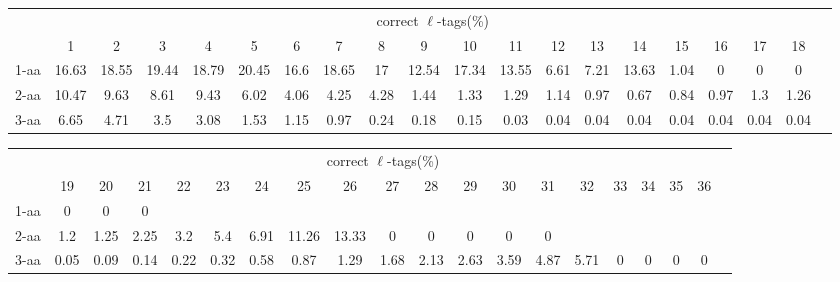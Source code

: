 \documentclass{article}[12pt]
\begin{document}
\begin{landscape}

\begin{table}[h]\tiny
\vspace{3mm}
{\centering
\begin{center}
\begin{tabular}{|l|c|c|c|c|c|c|c|c|c|c|c|c|c|c|c|c|c|c|c|}
  \hline
  & \multicolumn{ 18 }{|c|}{correct $\ell$-tags(\%)} \\
  \cline{2- 19}
    & 1 & 2 & 3 & 4 & 5 & 6 & 7 & 8 & 9 & 10 & 11 & 12 & 13 & 14 & 15 & 16 & 17 & 18\\
  \hline
1-aa  & 16.63 & 18.55 & 19.44 & 18.79 & 20.45 & 16.6 & 18.65 & 17 & 12.54 & 17.34 & 13.55 & 6.61 & 7.21 & 13.63 & 1.04 & 0 & 0 & 0\\
2-aa  & 10.47 & 9.63 & 8.61 & 9.43 & 6.02 & 4.06 & 4.25 & 4.28 & 1.44 & 1.33 & 1.29 & 1.14 & 0.97 & 0.67 & 0.84 & 0.97 & 1.3 & 1.26\\
3-aa  & 6.65 & 4.71 & 3.5 & 3.08 & 1.53 & 1.15 & 0.97 & 0.24 & 0.18 & 0.15 & 0.03 & 0.04 & 0.04 & 0.04 & 0.04 & 0.04 & 0.04 & 0.04\\
 \hline
\end{tabular}
\end{center}
\par}
\centering

\vspace{3mm}
\end{table}
\begin{table}[h]\tiny
\vspace{3mm}
{\centering
\begin{center}
\begin{tabular}{|l|c|c|c|c|c|c|c|c|c|c|c|c|c|c|c|c|c|c|c|}
  \hline
  & \multicolumn{ 18 }{|c|}{correct $\ell$-tags(\%)} \\
  \cline{2- 19}
    & 19 & 20 & 21 & 22 & 23 & 24 & 25 & 26 & 27 & 28 & 29 & 30 & 31 & 32 & 33 & 34 & 35 & 36\\
  \hline
1-aa  & 0 & 0 & 0 &  &  &  &  &  &  &  &  &  &  &  &  &  &  & \\
2-aa  & 1.2 & 1.25 & 2.25 & 3.2 & 5.4 & 6.91 & 11.26 & 13.33 & 0 & 0 & 0 & 0 & 0 &  &  &  &  & \\
3-aa  & 0.05 & 0.09 & 0.14 & 0.22 & 0.32 & 0.58 & 0.87 & 1.29 & 1.68 & 2.13 & 2.63 & 3.59 & 4.87 & 5.71 & 0 & 0 & 0 & 0\\
 \hline
\end{tabular}
\end{center}
\par}
\centering


\end{table}
\end{landscape}
\end{document}
